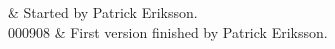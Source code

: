 %
%
 \label{sec:rte}


%
%
 & Started by Patrick Eriksson. \\
  000908 & First version finished by Patrick Eriksson. \\
\stophistory



%
%
%



